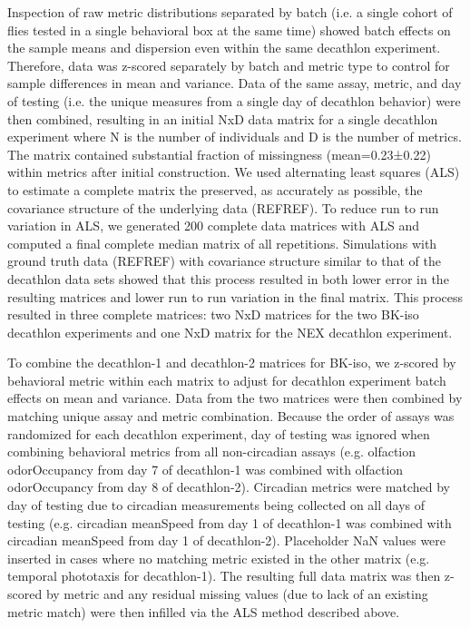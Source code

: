 \documentclass[12pt,letterpaper]{article}
\begin{document}
Inspection of raw metric distributions separated by batch (i.e. a single cohort of flies tested in a single behavioral box at the same time) showed batch effects on the sample means and dispersion even within the same decathlon experiment. Therefore, data was z-scored separately by batch and metric type to control for sample differences in mean and variance. Data of the same assay, metric, and day of testing (i.e. the unique measures from a single day of decathlon behavior) were then combined, resulting in an initial NxD data matrix for a single decathlon experiment where N is the number of individuals and D is the number of metrics. The matrix contained substantial fraction of missingness (mean=0.23±0.22) within metrics after initial construction. We used alternating least squares (ALS) to estimate a complete matrix the preserved, as accurately as possible, the covariance structure of the underlying data (REFREF). To reduce run to run variation in ALS, we generated 200 complete data matrices with ALS and computed a final complete median matrix of all repetitions. Simulations with ground truth data (REFREF) with covariance structure similar to that of the decathlon data sets showed that this process resulted in both lower error in the resulting matrices and lower run to run variation in the final matrix. This process resulted in three complete matrices: two NxD matrices for the two BK-iso decathlon experiments and one NxD matrix for the NEX decathlon experiment.

To combine the decathlon-1 and decathlon-2 matrices for BK-iso, we z-scored by behavioral metric within each matrix to adjust for decathlon experiment batch effects on mean and variance. Data from the two matrices were then combined by matching unique assay and metric combination. Because the order of assays was randomized for each decathlon experiment, day of testing was ignored when combining behavioral metrics from all non-circadian assays (e.g. olfaction odorOccupancy from day 7 of decathlon-1 was combined with olfaction odorOccupancy from day 8 of decathlon-2). Circadian metrics were matched by day of testing due to circadian measurements being collected on all days of testing (e.g. circadian meanSpeed from day 1 of decathlon-1 was combined with circadian meanSpeed from day 1 of decathlon-2). Placeholder NaN values were inserted in cases where no matching metric existed in the other matrix (e.g. temporal phototaxis for decathlon-1). The resulting full data matrix was then z-scored by metric and any residual missing values (due to lack of an existing metric match) were then infilled via the ALS method described above.
\end{document}
